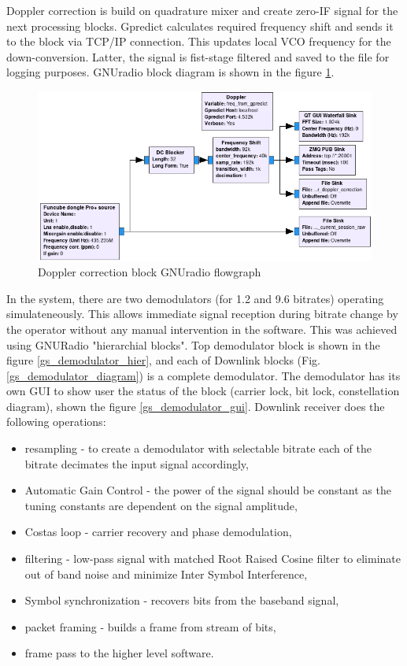 Doppler correction is build on quadrature mixer and create zero-IF signal for the next processing blocks. Gpredict calculates required frequency shift and sends it to the block via TCP/IP connection. This updates local VCO frequency for the down-conversion. Latter, the signal is fist-stage filtered and saved to the file for logging purposes. GNUradio block diagram is shown in the figure \ref{gs_doppler_gnuradio}.

\begin{figure}[H]
    \centering
    \includegraphics[width=0.7\paperwidth]{img/7/gs_doppler_gnuradio.png}
    \caption{Doppler correction block GNUradio flowgraph}
    \label{gs_doppler_gnuradio}
\end{figure}

In the system, there are two demodulators (for \SI{1.2}{\kbps} and \SI{9.6}{\kbps} bitrates) operating simulateneously. This allows immediate signal reception during bitrate change by the operator without any manual intervention in the software. This was achieved using GNURadio "hierarchial blocks". Top demodulator block is shown in the figure \ref{gs_demodulator_hier}, and each of Downlink blocks (Fig. \ref{gs_demodulator_diagram}) is a complete demodulator. The demodulator has its own GUI to show user the status of the block (carrier lock, bit lock, constellation diagram), shown the figure \ref{gs_demodulator_gui}.
Downlink receiver does the following operations:
\begin{itemize}
    \item resampling - to create a demodulator with selectable bitrate each of the bitrate decimates the input signal accordingly,
    \item Automatic Gain Control - the power of the signal should be constant as the tuning constants are dependent on the signal amplitude,
    \item Costas loop - carrier recovery and phase demodulation,
    \item filtering - low-pass signal with matched Root Raised Cosine filter to eliminate out of band noise and minimize Inter Symbol Interference,
    \item Symbol synchronization - recovers bits from the baseband signal,
    \item packet framing - builds a frame from stream of bits,
    \item frame pass to the higher level software.
\end{itemize}

